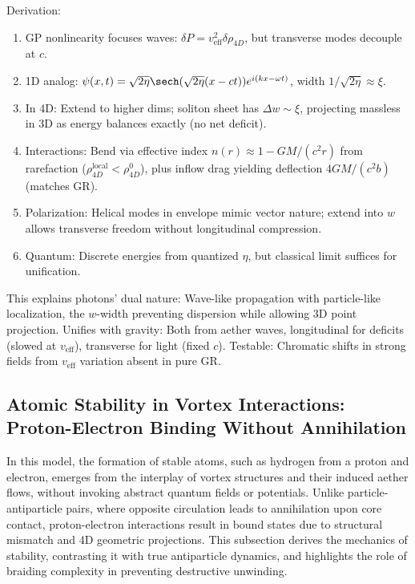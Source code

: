 Derivation:
\begin{enumerate}
\item GP nonlinearity focuses waves: $\delta P = v_{\text{eff}}^2 \delta \rho_{4D}$, but transverse modes decouple at $c$.
\item 1D analog: $\psi(x,t) = \sqrt{2 \eta} \sech(\sqrt{2 \eta} (x - c t)) e^{i (k x - \omega t)}$, width $1 / \sqrt{2 \eta} \approx \xi$.
\item In 4D: Extend to higher dims; soliton sheet has $\Delta w \sim \xi$, projecting massless in 3D as energy balances exactly (no net deficit).
\item Interactions: Bend via effective index $n(r) \approx 1 - GM/(c^2 r)$ from rarefaction ($\rho_{4D}^{\text{local}} < \rho_{4D}^0$), plus inflow drag yielding deflection $4 GM / (c^2 b)$ (matches GR).
\item Polarization: Helical modes in envelope mimic vector nature; extend into $w$ allows transverse freedom without longitudinal compression.
\item Quantum: Discrete energies from quantized $\eta$, but classical limit suffices for unification.
\end{enumerate}

This explains photons' dual nature: Wave-like propagation with particle-like localization, the $w$-width preventing dispersion while allowing 3D point projection. Unifies with gravity: Both from aether waves, longitudinal for deficits (slowed at $v_{\text{eff}}$), transverse for light (fixed $c$). Testable: Chromatic shifts in strong fields from $v_{\text{eff}}$ variation absent in pure GR.

\subsection{Atomic Stability in Vortex Interactions: Proton-Electron Binding Without Annihilation}

In this model, the formation of stable atoms, such as hydrogen from a proton and electron, emerges from the interplay of vortex structures and their induced aether flows, without invoking abstract quantum fields or potentials. Unlike particle-antiparticle pairs, where opposite circulation leads to annihilation upon core contact, proton-electron interactions result in bound states due to structural mismatch and 4D geometric projections. This subsection derives the mechanics of stability, contrasting it with true antiparticle dynamics, and highlights the role of braiding complexity in preventing destructive unwinding.


